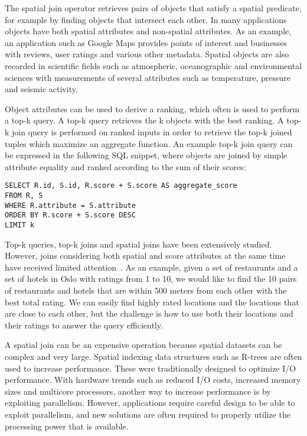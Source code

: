 The spatial join operator retrieves pairs of objects that satisfy a spatial predicate, for example by finding objects that intersect each other. In many applications objects have both spatial attributes and non-spatial attributes. As an example, an application such as Google Maps provides points of interest and businesses with reviews, user ratings and various other metadata. Spatial objects are also recorded in scientific fields such as atmospheric, oceanographic and environmental sciences with measurements of several attributes such as temperature, pressure and seismic activity.

Object attributes can be used to derive a ranking, which often is used to perform a top-k query. A top-k query retrieves the k objects with the best ranking. A top-k join query is performed on ranked inputs in order to retrieve the top-k joined tuples which maximize an aggregate function. An example top-k join query can be expressed in the following SQL snippet, where objects are joined by simple attribute equality and ranked according to the sum of their scores:

\begin{verbatim}
SELECT R.id, S.id, R.score + S.score AS aggregate_score
FROM R, S
WHERE R.attribute = S.attribute
ORDER BY R.score + S.score DESC
LIMIT k
\end{verbatim}

Top-k queries, top-k joins and spatial joins have been extensively studied. However, joins considering both spatial and score attributes at the same time have received limited attention~\cite{qi2013efficient}. As an example, given a set of restaurants and a set of hotels in Oslo with ratings from 1 to 10, we would like to find the 10 pairs of restaurants and hotels that are within 500 meters from each other with the best total rating. We can easily find highly rated locations and the locations that are close to each other, but the challenge is how to use both their locations and their ratings to answer the query efficiently.

A spatial join can be an expensive operation because spatial datasets can be complex and very large. Spatial indexing data structures such as R-trees are often used to increase performance. These were traditionally designed to optimize I/O performance. With hardware trends such as reduced I/O costs, increased memory sizes and multicore processors, another way to increase performance is by exploiting parallelism. However, applications require careful design to be able to exploit parallelism, and new solutions are often required to properly utilize the processing power that is available.

